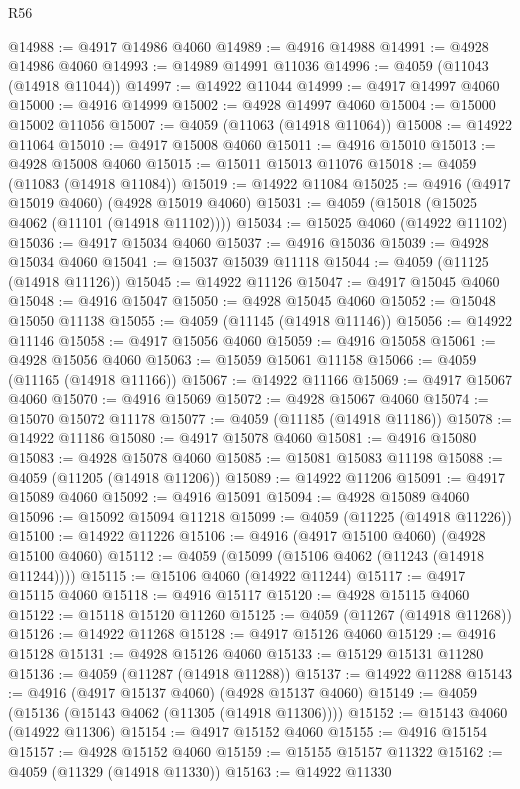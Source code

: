 \begin{lexlean}{R56}
\begin{coremodule}
@14988 := @4917 @14986 @4060
@14989 := @4916 @14988
@14991 := @4928 @14986 @4060
@14993 := @14989 @14991 @11036
@14996 := @4059 (@11043 (@14918 @11044))
@14997 := @14922 @11044
@14999 := @4917 @14997 @4060
@15000 := @4916 @14999
@15002 := @4928 @14997 @4060
@15004 := @15000 @15002 @11056
@15007 := @4059 (@11063 (@14918 @11064))
@15008 := @14922 @11064
@15010 := @4917 @15008 @4060
@15011 := @4916 @15010
@15013 := @4928 @15008 @4060
@15015 := @15011 @15013 @11076
@15018 := @4059 (@11083 (@14918 @11084))
@15019 := @14922 @11084
@15025 := @4916 (@4917 @15019 @4060) (@4928 @15019 @4060)
@15031 := @4059 (@15018 (@15025 @4062 (@11101 (@14918 @11102))))
@15034 := @15025 @4060 (@14922 @11102)
@15036 := @4917 @15034 @4060
@15037 := @4916 @15036
@15039 := @4928 @15034 @4060
@15041 := @15037 @15039 @11118
@15044 := @4059 (@11125 (@14918 @11126))
@15045 := @14922 @11126
@15047 := @4917 @15045 @4060
@15048 := @4916 @15047
@15050 := @4928 @15045 @4060
@15052 := @15048 @15050 @11138
@15055 := @4059 (@11145 (@14918 @11146))
@15056 := @14922 @11146
@15058 := @4917 @15056 @4060
@15059 := @4916 @15058
@15061 := @4928 @15056 @4060
@15063 := @15059 @15061 @11158
@15066 := @4059 (@11165 (@14918 @11166))
@15067 := @14922 @11166
@15069 := @4917 @15067 @4060
@15070 := @4916 @15069
@15072 := @4928 @15067 @4060
@15074 := @15070 @15072 @11178
@15077 := @4059 (@11185 (@14918 @11186))
@15078 := @14922 @11186
@15080 := @4917 @15078 @4060
@15081 := @4916 @15080
@15083 := @4928 @15078 @4060
@15085 := @15081 @15083 @11198
@15088 := @4059 (@11205 (@14918 @11206))
@15089 := @14922 @11206
@15091 := @4917 @15089 @4060
@15092 := @4916 @15091
@15094 := @4928 @15089 @4060
@15096 := @15092 @15094 @11218
@15099 := @4059 (@11225 (@14918 @11226))
@15100 := @14922 @11226
@15106 := @4916 (@4917 @15100 @4060) (@4928 @15100 @4060)
@15112 := @4059 (@15099 (@15106 @4062 (@11243 (@14918 @11244))))
@15115 := @15106 @4060 (@14922 @11244)
@15117 := @4917 @15115 @4060
@15118 := @4916 @15117
@15120 := @4928 @15115 @4060
@15122 := @15118 @15120 @11260
@15125 := @4059 (@11267 (@14918 @11268))
@15126 := @14922 @11268
@15128 := @4917 @15126 @4060
@15129 := @4916 @15128
@15131 := @4928 @15126 @4060
@15133 := @15129 @15131 @11280
@15136 := @4059 (@11287 (@14918 @11288))
@15137 := @14922 @11288
@15143 := @4916 (@4917 @15137 @4060) (@4928 @15137 @4060)
@15149 := @4059 (@15136 (@15143 @4062 (@11305 (@14918 @11306))))
@15152 := @15143 @4060 (@14922 @11306)
@15154 := @4917 @15152 @4060
@15155 := @4916 @15154
@15157 := @4928 @15152 @4060
@15159 := @15155 @15157 @11322
@15162 := @4059 (@11329 (@14918 @11330))
@15163 := @14922 @11330

\end{coremodule}
\end{lexlean}
